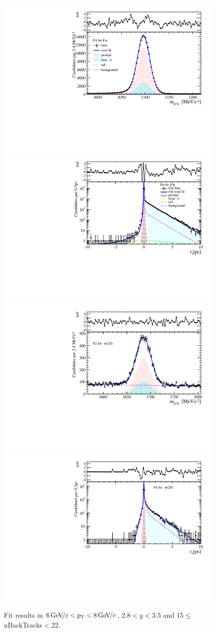 \begin{figure}[H]
\begin{center}
\includegraphics[width=0.47\linewidth]{pdf/Jpsi/drawmassB/n3y2pt4.pdf}
\includegraphics[width=0.47\linewidth]{pdf/Jpsi/2DFitB/n3y2pt4.pdf}
\vspace*{-0.5cm}
\includegraphics[width=0.47\linewidth]{pdf/Psi2S/drawmassB/n3y2pt4.pdf}
\includegraphics[width=0.47\linewidth]{pdf/Psi2S/2DFitB/n3y2pt4.pdf}
\vspace*{-0.5cm}
\end{center}
\caption{Fit results in $6\text{\,Ge\kern -0.1em V\!/}c<p_{\mathrm{T}}<8\text{\,Ge\kern -0.1em V\!/}c$, $2.8<y<3.5$ and 15$\leq$nBackTracks$<$22.}
\label{Fitn3y2pt4}
\end{figure}

